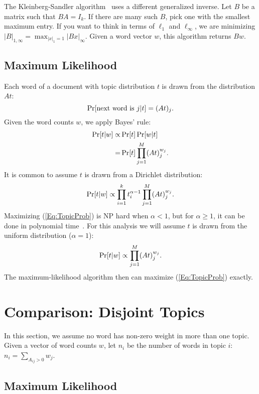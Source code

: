 \documentclass{article}
\begin{document}
The Kleinberg-Sandler algorithm~\cite{kleinberg2004using} uses a different generalized inverse.
Let \(B\) be a matrix such that \(BA = I_k\).
If there are many such \(B\), pick one with the smallest maximum entry.
If you want to think in terms of \(\ell_1\) and \(\ell_\infty\), we are minimizing \(|B|_{1,\infty} = \max_{|x|_1 = 1} |B x|_\infty\).
Given a word vector \(w\), this algorithm returns \(Bw\).

\subsection{Maximum Likelihood}

Each word of a document with topic distribution \(t\) is drawn from the distribution \(A t\):
\[ \Pr[\text{next word is \(j\)} | t] = (A t)_j \ldotp \]
Given the word counts \(w\), we apply Bayes' rule:
\begin{align*}
    \Pr[t | w] \propto & \Pr[t] \Pr[w | t]
\\  = & \Pr[t] \prod_{j=1}^M (A t)_j^{w_j} \ldotp
\end{align*}
It is common to assume \(t\) is drawn from a Dirichlet distribution:
\begin{equation}
    \label{Eq:TopicProbWithAlpha}
    \Pr[t | w] \propto \prod_{i = 1}^k t_i^{\alpha - 1} \prod_{j=1}^M (A t)_j^{w_j} \ldotp
\end{equation}
Maximizing (\ref{Eq:TopicProb}) is NP hard when \(\alpha < 1\), but for \(\alpha \ge 1\), it can be done in polynomial time~\cite{conf/nips/SontagR11}.
For this analysis we will assume \(t\) is drawn from the uniform distribution (\(\alpha=1\)):
\begin{equation}
    \label{Eq:TopicProb}
    \Pr[t | w] \propto \prod_{j=1}^M (A t)_j^{w_j} \ldotp
\end{equation}
The maximum-likelihood algorithm then can maximize (\ref{Eq:TopicProb}) exactly.

\section{Comparison: Disjoint Topics}

In this section, we assume no word has non-zero weight in more than one topic.
Given a vector of word counts \(w\), let \(n_i\) be the number of words in topic \(i\): \(n_i = \sum_{A_{ij} > 0} w_j\).

\subsection{Maximum Likelihood}
\end{document}
